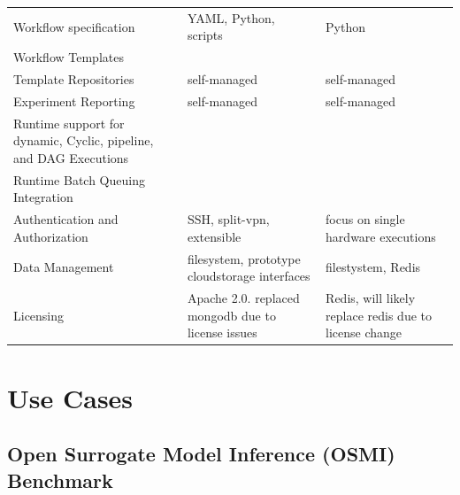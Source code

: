 \documentclass[sigconf]{acmart}
\newcommand{\YES}{\ding{51}}
\begin{document}
\begin{table}[htbp]
{\begin{tabular}{|p{6cm}|l|l|}
Workflow specification &  YAML, Python, scripts   & Python   \\
Workflow Templates &  \YES   &  \YES  \\ 
\hline
Template Repositories & self-managed    &  self-managed  \\ 
\hline
Experiment Reporting &  self-managed   & self-managed   \\ 
\hline
Runtime support for dynamic, Cyclic, pipeline, and DAG Executions &     \YES & \YES \\
\hline
Runtime Batch Queuing Integration &  \YES   & \YES   \\
\hline
Authentication and Authorization &  SSH, split-vpn, extensible   & focus on single hardware executions  \\
\hline
Data Management & filesystem, prototype cloudstorage interfaces   & filestystem, Redis   \\
\hline
Licensing & Apache 2.0. replaced mongodb due to license 
issues    & Redis, will likely replace redis due to license change \\
\hline
\end{tabular}
}
\end{table}



\section{Use Cases}
\label{sec:use_cases}


\subsection{Open Surrogate Model Inference (OSMI) Benchmark}
\end{document}
